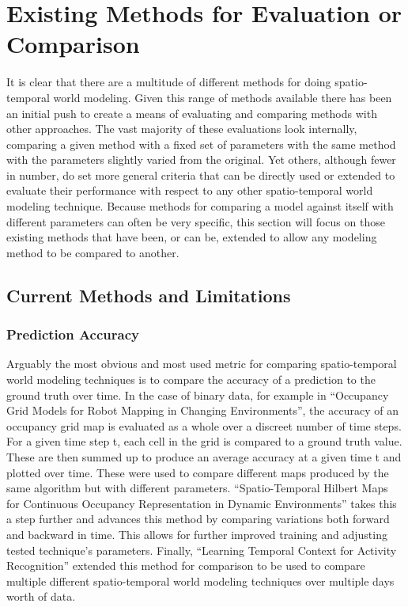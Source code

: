   \section{ Existing Methods for Evaluation or Comparison }

  It is clear that there are a multitude of different methods for doing
  spatio-temporal world modeling. Given this range of methods available
  there has been an initial push to create a means of evaluating and comparing methods
  with other approaches. The vast majority of these evaluations look internally,
  comparing a given method with a fixed set of parameters with the same method with
  the parameters slightly varied from the original. Yet others, although fewer
  in number, do set more general criteria that can be directly used or extended
  to evaluate their performance with respect to any other spatio-temporal
  world modeling technique. Because methods for comparing a model against itself
  with different parameters can often be very specific, this section will focus
  on those existing methods that have been, or can be, extended to allow any
  modeling method to be compared to another.

  \subsection{ Current Methods and Limitations}

  \subsubsection { Prediction Accuracy }
  Arguably the most obvious and most used metric for comparing spatio-temporal
  world modeling techniques is to compare the accuracy of a prediction
  to the ground truth over time. In the case of binary data, for example in
  ``Occupancy Grid Models for Robot Mapping in Changing Environments'',
  \cite{Meyer-Delius2012} the accuracy of an occupancy grid map is evaluated as
  a whole over a discreet number of time steps. For a given time step t,
  each cell in the grid is compared to a ground truth value. These are then
  summed up to produce an average accuracy at a given time t and plotted over
  time. These were used to compare different maps produced by the same algorithm
  but with different parameters. ``Spatio-Temporal Hilbert Maps for Continuous
  Occupancy Representation in Dynamic Environments'' \cite{Senanayake2016}
  takes this a step further and advances this method by comparing variations
  both forward and backward in time. This allows for further
  improved training and adjusting tested technique's parameters. Finally,
  ``Learning Temporal Context for Activity Recognition'' \cite{Coppola2016}
  extended this method for comparison to be used to compare multiple different
  spatio-temporal world modeling techniques over multiple days worth of data.

